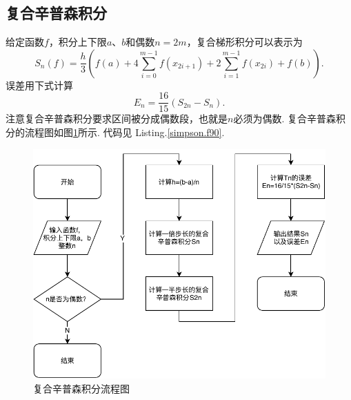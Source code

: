 \documentclass{article}
\begin{document}
	\subsection{复合辛普森积分}
	给定函数$f$，积分上下限$a$、$b$和偶数$n=2m$，复合梯形积分可以表示为
	\[
	S_{n}(f)=\frac{h}{3}\left(f(a)+4 \sum_{i=0}^{m-1} f\left(x_{2 i+1}\right)+2 \sum_{i=1}^{m-1} f\left(x_{2 i}\right)+f(b)\right).
	\]
	误差用下式计算
	\[
	E_n=\frac{16}{15}(S_{2n}-S_n).
	\]
	注意复合辛普森积分要求区间被分成偶数段，也就是$n$必须为偶数. 复合辛普森积分的流程图如图\ref{fig:simpson}所示. 代码见 Listing.\ref{simpson.f90}.
	\begin{figure}[h!tb]
		\centering
		\includegraphics[width=1.0\textwidth]{./utils/simpson.pdf}
		\caption{ 复合辛普森积分流程图\label{fig:simpson}}
	\end{figure}
	
	
\end{document}
